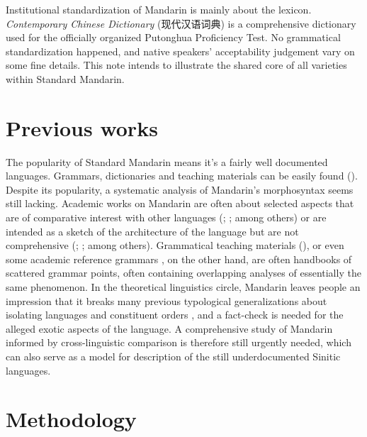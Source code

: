 \documentclass[UTF8, a4paper, oneside, scheme=plain, 12pt]{ctexrep}
\newcommand*{\citechap}[1]{chap.~{#1}}
\newcommand{\work}[1]{\textit{#1}}
\begin{document}
Institutional standardization of Mandarin is mainly about the lexicon.
\work{Contemporary Chinese Dictionary} (现代汉语词典)
is a comprehensive dictionary used for the officially organized 
Putonghua Proficiency Test.
No grammatical standardization happened,
and native speakers' acceptability judgement vary 
on some fine details.
This note intends to illustrate the shared core 
of all varieties within Standard Mandarin.

\section{Previous works}

The popularity of Standard Mandarin means it's a fairly well documented languages.
Grammars, dictionaries and teaching materials can be easily found 
().
Despite its popularity, 
a systematic analysis of Mandarin's morphosyntax 
seems still lacking.
Academic works on Mandarin are often 
about selected aspects that are of comparative interest with other languages
(\citealt{paul2014new}; \citealt{huang2018handbook}; among others)
or are intended as a sketch of the architecture of the language 
but are not comprehensive 
(\citealt{zhudexigrammar}; \citealt{deng2010formal}; among others). 
Grammatical teaching materials (\citealt*{po2015chinese}), 
or even some academic reference grammars \citep{li1989mandarin}, on the other hand,
are often handbooks of scattered grammar points,
often containing overlapping analyses of essentially the same phenomenon.
In the theoretical linguistics circle, 
Mandarin leaves people an impression that 
it breaks many previous typological generalizations about isolating languages and constituent orders
\citep[\citechap{8}]{paul2014new},
and a fact-check is needed for the alleged exotic aspects of the language.
A comprehensive study of Mandarin informed by cross-linguistic comparison 
is therefore still urgently needed,
which can also serve as a model for description of the still underdocumented Sinitic languages.

\section{Methodology}
\end{document}
